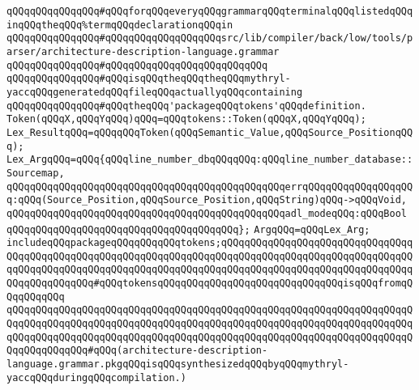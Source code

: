 \verb|qQQqqQQqqQQqqQQq#qQQqforqQQqeveryqQQqgrammarqQQqterminalqQQqlistedqQQqinqQQqtheqQQq%termqQQqdeclarationqQQqin|\newline
\verb|qQQqqQQqqQQqqQQq#qQQqqQQqqQQqqQQqqQQqsrc/lib/compiler/back/low/tools/parser/architecture-description-language.grammar|\newline
\verb|qQQqqQQqqQQqqQQq#qQQqqQQqqQQqqQQqqQQq|\verb|qQQqqQQq|\newline
\verb|qQQqqQQqqQQqqQQq#qQQqisqQQqtheqQQqtheqQQqmythryl-yaccqQQqgeneratedqQQqfileqQQqactuallyqQQqcontaining|\newline
\verb|qQQqqQQqqQQqqQQq#qQQqtheqQQq'packageqQQqtokens'qQQqdefinition.|\newline
\newline
\newline
\verb|Token(qQQqX,qQQqYqQQq)qQQq=qQQqtokens::Token(qQQqX,qQQqYqQQq);|\newline
\verb|Lex_ResultqQQq=qQQqqQQqToken(qQQqSemantic_Value,qQQqSource_PositionqQQq);|\newline
\newline
\verb|Lex_ArgqQQq=qQQq{qQQqline_number_dbqQQqqQQq:qQQqline_number_database::Sourcemap,|\newline
\verb|qQQqqQQqqQQqqQQqqQQqqQQqqQQqqQQqqQQqqQQqqQQqqQQqerrqQQqqQQqqQQqqQQqqQQq:qQQq(Source_Position,qQQqSource_Position,qQQqString)qQQq->qQQqVoid,|\newline
\verb|qQQqqQQqqQQqqQQqqQQqqQQqqQQqqQQqqQQqqQQqqQQqqQQqadl_modeqQQq:qQQqBool|\newline
\verb|qQQqqQQqqQQqqQQqqQQqqQQqqQQqqQQqqQQqqQQq};|\newline
\newline
\verb|ArgqQQq=qQQqLex_Arg;|\newline
\newline
\verb|includeqQQqpackageqQQqqQQqqQQqtokens;qQQqqQQqqQQqqQQqqQQqqQQqqQQqqQQqqQQqqQQqqQQqqQQqqQQqqQQqqQQqqQQqqQQqqQQqqQQqqQQqqQQqqQQqqQQqqQQqqQQqqQQqqQQqqQQqqQQqqQQqqQQqqQQqqQQqqQQqqQQqqQQqqQQqqQQqqQQqqQQqqQQqqQQqqQQqqQQqqQQqqQQqqQQq#qQQqtokensqQQqqQQqqQQqqQQqqQQqqQQqqQQqqQQqisqQQqfromqQQqqQQqqQQq|\newline
\verb|qQQqqQQqqQQqqQQqqQQqqQQqqQQqqQQqqQQqqQQqqQQqqQQqqQQqqQQqqQQqqQQqqQQqqQQqqQQqqQQqqQQqqQQqqQQqqQQqqQQqqQQqqQQqqQQqqQQqqQQqqQQqqQQqqQQqqQQqqQQqqQQqqQQqqQQqqQQqqQQqqQQqqQQqqQQqqQQqqQQqqQQqqQQqqQQqqQQqqQQqqQQqqQQqqQQqqQQqqQQqqQQq#qQQq(architecture-description-language.grammar.pkgqQQqisqQQqsynthesizedqQQqbyqQQqmythryl-yaccqQQqduringqQQqcompilation.)|\newline
